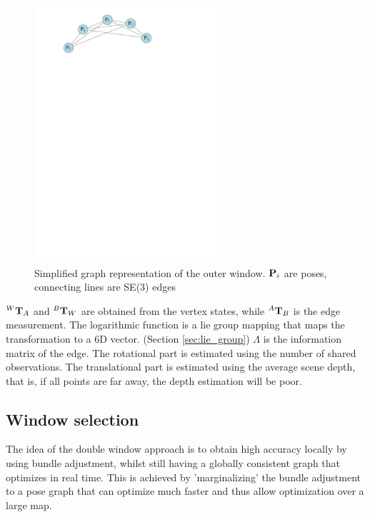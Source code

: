 \begin{figure}[h!]
  \centering
    \includegraphics[width=0.6\textwidth]{chapters/images/outer_window}
  \caption{Simplified graph representation of the outer window.  $\mathbf P_i$ are poses, connecting lines are SE(3) edges}
  \label{fig:outer_window}
\end{figure}

$^{W}\mathbf T_{A}$ and $^{B} \mathbf T_{W}$ are obtained from the vertex states, while $^{A} \mathbf T_{B}$ is the edge measurement.  The logarithmic function is a lie group mapping that maps the transformation to a 6D vector. (Section \ref{sec:lie_group})  $\Lambda$ is the information matrix of the edge.  The rotational part is estimated using the number of shared observations.  The translational part is estimated using the average scene depth, that is, if all points are far away, the depth estimation will be poor.

\subsection{Window selection}

The idea of the double window approach is to obtain high accuracy locally by using bundle adjustment, whilst still having a globally consistent graph that optimizes in real time.  This is achieved by 'marginalizing' the bundle adjustment to a pose graph that can optimize much faster and thus allow optimization over a large map.

